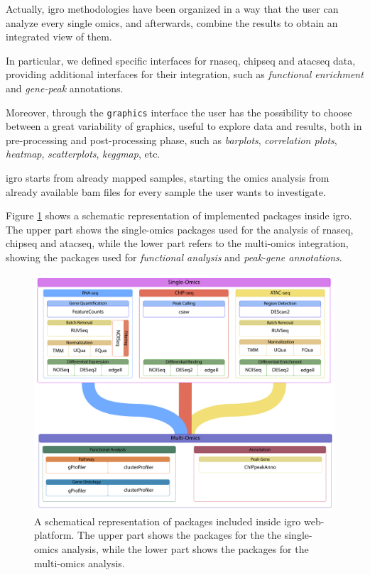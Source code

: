 Actually, \gls{igro} methodologies have been organized in a way that the user can analyze every single omics, and afterwards, combine the results to obtain an integrated view of them.

In particular, we defined specific interfaces for \gls{rnaseq}, \gls{chipseq} and \gls{atacseq} data, providing additional interfaces for their integration, such as \textit{functional enrichment} and \textit{gene-peak} annotations.

Moreover, through the \lstinline!graphics! interface the user has the possibility to choose between a great variability of graphics, useful to explore data and results, both in pre-processing and post-processing phase, such as \textit{barplots}, \textit{correlation plots}, \textit{heatmap}, \textit{scatterplots}, \textit{keggmap}, etc.

\Gls{igro} starts from already mapped samples, starting the omics analysis from already available \gls{bam} files for every sample the user wants to investigate.

Figure \ref{fig:integrhopackscheme} shows a schematic representation of implemented packages inside \gls{igro}.
The upper part shows the single-omics packages used for the analysis of \gls{rnaseq}, \gls{chipseq} and \gls{atacseq}, while the lower part refers to the multi-omics integration, showing the packages used for \textit{functional analysis} and \textit{peak-gene annotations}.

\begin{figure}[ht]
\centering
\includegraphics[width=\textwidth, keepaspectratio]{img/integrho/integrho_pack_scheme.pdf}
\caption[IntegrHO packages scheme]{A schematical representation of packages included inside \gls{igro} web-platform.
The upper part shows the packages for the the single-omics analysis, while the lower part shows the packages for the multi-omics analysis.}
\label{fig:integrhopackscheme}
\end{figure}

